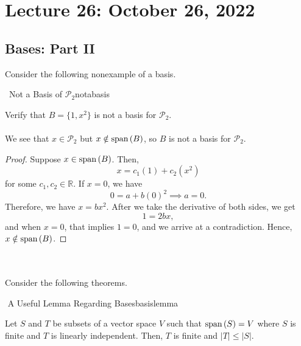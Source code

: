 \pagebreak

\section{Lecture 26: October 26, 2022}

    \subsection{Bases: Part II}

        Consider the following nonexample of a basis.
        \begin{example}{\Difficulty\,\Difficulty\,\,Not a Basis of \(\mathcal{P}_2\)}{notabasis}

            Verify that \(B=\{1,x^2\}\) is not a basis for \(\mathcal{P}_2\).
            \\
            \\
           We see that \(x\in\mathcal{P}_2\) but \(x\notin\text{span\,}(B)\), so \(B\) is not a basis for \(\mathcal{P}_2\).
            \begin{proof}
                Suppose \(x\in\text{span\,}(B)\). Then,
                \begin{equation*}
                    x=c_1(1)+c_2(x^2)
                \end{equation*}
                for some \(c_1,c_2\in\mathbb{R}\). If \(x=0\), we have
                \begin{equation*}
                    0=a+b(0)^2\implies a=0.
                \end{equation*} 
                Therefore, we have \(x=bx^2\). After we take the derivative of both sides, we get
                \begin{equation*}
                    1=2bx,
                \end{equation*}
                and when \(x=0\), that implies \(1=0\), and we arrive at a contradiction. Hence, \(x\notin\text{span\,}(B)\).
            \end{proof}
            
        \end{example}
        \vphantom
        \\
        \\
        Consider the following theorems.
        \begin{theorem}{\Stop\,\,A Useful Lemma Regarding Bases}{basislemma}

            Let \(S\) and \(T\) be subsets of a vector space \(V\) such that \(\text{span\,}(S)=V\) where \(S\) is finite and \(T\) is linearly independent. Then, \(T\) is finite and \(|T|\leq|S|\).
    
        \end{theorem}
